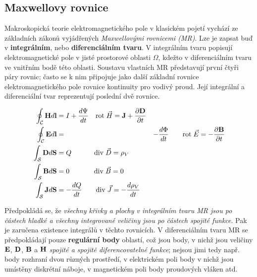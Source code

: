     \subsection{Maxwellovy rovnice}
      Makroskopická teorie elektromagnetického pole v klasickém pojetí vychází ze základních zákonů
      vyjádřených \emph{Maxwellovými rovnicemi (MR)}. Lze je zapsat buď v \textbf{integrálním},
      nebo \textbf{diferenciálním tvaru}. V integrálním tvaru popisují elektromagnetické pole v
      jisté prostorové oblasti $\Omega$, kdežto v diferenciálním tvaru ve vnitřním bodě této
      oblasti. Soustavu vlastních MR představují první čtyři páry rovnic; často se k nim připojuje
      jako další základní rovnice elektromagnetického pole rovnice kontinuity pro vodivý proud.
      Její integrální a diferenciální tvar reprezentují poslední dvě rovnice.

      \begin{align}
        \oint_\mathcal{C}\mathbf{H} d\mathbf{l} &= I+\frac{d \Psi}{d t}
                                           \quad \mathrm{rot}\;\vec{H}=\mathbf{J}+\frac{\partial \mathbf{D}}{\partial t}             \\
        \oint_\mathcal{C}\mathbf{E} d\mathbf{l} &=& -\frac{d \Phi}{d t}
                               \qquad \mathrm{rot}\;\vec{E}=-\frac{\partial \mathbf{B}}{\partial t}\\
         \int_\mathcal{S}\mathbf{D} d\mathbf{S} &= Q \qquad\quad\;   \mathrm{div}\;\vec{D}=\rho_V                \\
         \int_\mathcal{S}\mathbf{B} d\mathbf{S} &= 0 \qquad\quad\;\; \mathrm{div}\;\vec{B}=0                     \\
         \int_\mathcal{S}\mathbf{J} d\mathbf{S} &= -\frac{d Q}{d t} \qquad\mathrm{div}\;\vec{J}=-\frac{d \rho_V}{d t}
      \end{align}

      Předpokládá se, že \emph{všechny křivky a plochy v integrálním tvaru MR jsou po částech
      hladké a všechny integrované veličiny jsou po částech spojité funkce}. Pak je zaručena
      existence integrálů v těchto rovnicích. V diferenciálním tvaru MR se předpokládají pouze
      \textbf{regulární body} oblastí, což jsou body, v nichž jsou veličiny $\mathbf{E}$, $\mathbf{D}$,
      $\mathbf{B}$ a $\mathbf{H}$ \emph{spojité a spojitě diferencovatelné funkce}; nejsou jimi tedy např.
      body rozhraní dvou různých prostředí, v elektrickém poli body v nichž jsou umístěny diskrétní
      náboje, v magnetickém poli body proudových vláken atd.

